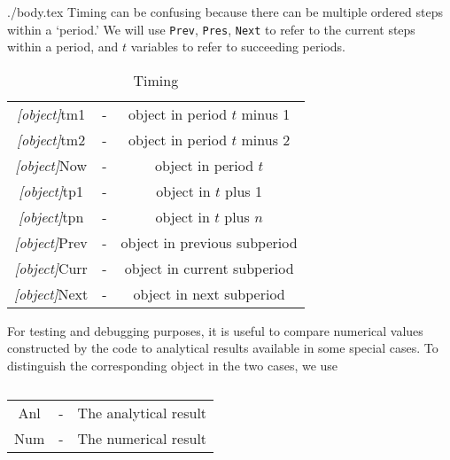 \documentclass[12pt]{econtex}
\begin{document}
\begin{verbatimwrite}{./body.tex}
Timing can be confusing because there can be multiple ordered steps 
within a `period.'  We will use \texttt{Prev}, \texttt{Pres}, \texttt{Next} to refer
to the current steps within a period, and $t$ variables to refer to succeeding periods.
\begin{table}[h]
	\centering 
	\begin{tabular}{||>{\ttfamily}ccc||} 		
		\hline
   \textit{[object]}tm1 & - & object in period $t$ minus 1 
\\ \textit{[object]}tm2 & - & object in period $t$ minus 2 
\\ \textit{[object]}Now & - & object in period $t$
\\ \textit{[object]}tp1 & - & object in $t$ plus 1 
\\ \textit{[object]}tpn & - & object in $t$ plus $n$ 
\\ \textit{[object]}Prev & - & object in previous subperiod
\\ \textit{[object]}Curr & - & object in current subperiod
\\ \textit{[object]}Next & - & object in next subperiod
\\	\hline
	\end{tabular}

	\caption{Timing}
	\label{table:Timing}
\end{table}	

For testing and debugging purposes, it is useful to compare numerical 
values constructed by the code to analytical results available in some
special cases.  To distinguish the corresponding object in the two cases,
we use
\begin{table}[h]
	\centering
	\begin{tabular}{||>{\ttfamily}ccc||} 		
		\hline
Anl & - & The analytical result
\\ Num & - & The numerical result 
\\ \hline
	\end{tabular}
	\caption{}
	\label{table:AnlVsNum}
\end{table}	
\end{verbatimwrite}

\end{document}
